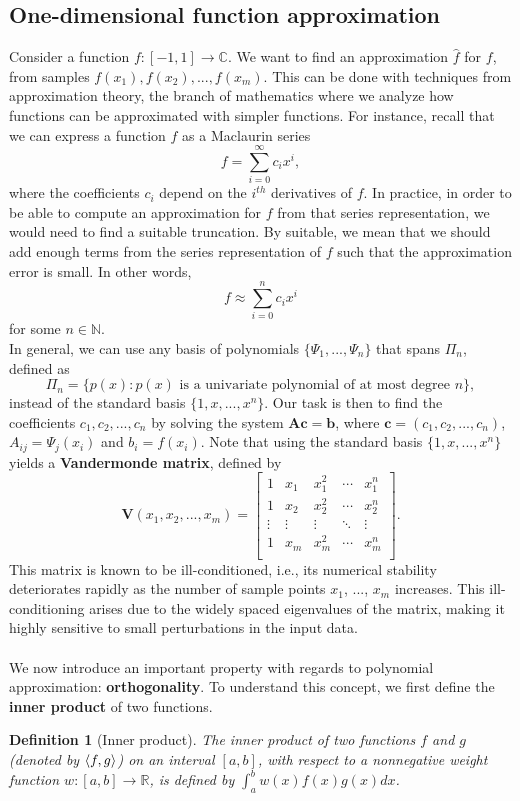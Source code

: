 \documentclass[12pt, oneside]{report}   	%
\newcommand{\R}{\mathbb{R}}
\newcommand{\C}{\mathbb{C}}
\newcommand{\N}{\mathbb{N}}
\newtheorem{defn}{Definition}
\DeclarePairedDelimiter{\inner}{\langle}{\rangle}
\begin{document}
\subsection{One-dimensional function approximation}
\label{subsec:oned}

Consider a function $f:[-1,1]\to\C$. We want to find an approximation $\hat{f}$ for $f$, from samples $f(x_1), f(x_2), ..., f(x_m)$. This can be done with techniques from approximation theory, the branch of mathematics where we analyze how functions can be approximated with simpler functions. For instance, recall that we can express a function $f$ as a Maclaurin series
$$
f = \sum\limits_{i=0}^{\infty} c_i x^i,
$$
where the coefficients $c_i$ depend on the $i^{th}$ derivatives of $f$. In practice, in order to be able to compute an approximation for $f$ from that series representation, we would need to find a suitable truncation. By suitable, we mean that we should add enough terms from the series representation of $f$ such that the approximation error is small. In other words,
$$
f \approx \sum\limits_{i=0}^{n} c_i x^i
$$
for some $n\in\N$.\\
In general, we can use any basis of polynomials $\{\Psi_1,...,\Psi_n\}$ that spans $\Pi_n$, defined as
\begin{equation}
\label{eq:pi_n}
\Pi_n = \{p(x): p(x) \text{ is a univariate polynomial of at most degree } n\},
\end{equation}
instead of the standard basis $\{1,x,...,x^n\}$. Our task is then to find the coefficients $c_1,c_2,...,c_n$ by solving the system $\boldsymbol{A}\boldsymbol{c}=\boldsymbol{b}$, where $\boldsymbol{c}=(c_1,c_2,...,c_n)$, $A_{ij}=\Psi_j(x_i)$ and $b_i=f(x_i)$. Note that using the standard basis $\{1,x,...,x^n\}$ yields a \textbf{Vandermonde matrix}, defined by
$$
\boldsymbol{V}(x_1,x_2,...,x_m) = \begin{bmatrix}
1 & x_1 & x_1^2 & \cdots & x_1^n \\
1 & x_2 & x_2^2 & \cdots & x_2^n \\
\vdots & \vdots & \vdots & \ddots & \vdots \\
1 & x_m & x_m^2 & \cdots & x_m^n \\
\end{bmatrix}.
$$
This matrix is known to be ill-conditioned, i.e., its numerical stability deteriorates rapidly as the number of sample points $x_1$, ..., $x_m$ increases. This ill-conditioning arises due to the widely spaced eigenvalues of the matrix, making it highly sensitive to small perturbations in the input data.\\\\
We now introduce an important property with regards to polynomial approximation: \textbf{orthogonality}. To understand this concept, we first define the \textbf{inner product} of two functions.
\begin{defn}[Inner product]
The inner product of two functions $f$ and $g$ (denoted by $\inner{f,g}$) on an interval $[a,b]$, with respect to a nonnegative weight function $w:[a,b]\to\R$, is defined by $\int_a^b w(x)f(x)g(x) dx$.
\end{defn}
\smallskip
\end{document}
